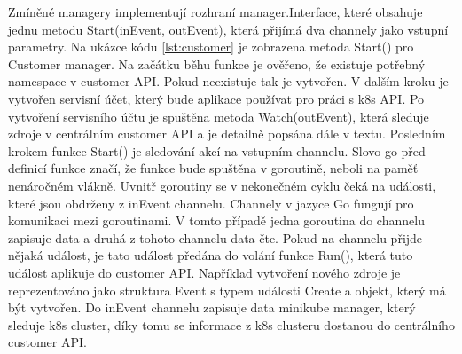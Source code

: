Zmíněné managery implementují rozhraní manager.Interface, které obsahuje jednu metodu Start(inEvent, outEvent), která přijímá dva channely jako vstupní parametry. Na ukázce kódu \ref{lst:customer} je zobrazena metoda Start() pro Customer manager. Na začátku běhu funkce je ověřeno, že existuje potřebný namespace v customer API. Pokud neexistuje tak je vytvořen. V dalším kroku je vytvořen servisní účet, který bude aplikace používat pro práci s k8s API. Po vytvoření servisního účtu je spuštěna metoda Watch(outEvent), která sleduje zdroje v centrálním customer API a je detailně popsána dále v textu. Posledním krokem funkce Start() je sledování akcí na vstupním channelu. Slovo go před definicí funkce značí, že funkce bude spuštěna v goroutině, neboli na paměť nenáročném vlákně. Uvnitř goroutiny se v nekonečném cyklu čeká na události, které jsou obdrženy z inEvent channelu. Channely v jazyce Go fungují pro komunikaci mezi goroutinami. V tomto případě jedna goroutina do channelu zapisuje data a druhá z tohoto channelu data čte. Pokud na channelu přijde nějaká událost, je tato událost předána do volání funkce Run(), která tuto událost aplikuje do customer API. Například vytvoření nového zdroje je reprezentováno jako struktura Event s typem události Create a objekt, který má být vytvořen. Do inEvent channelu zapisuje data minikube manager, který sleduje k8s cluster, díky tomu se informace z k8s clusteru dostanou do centrálního customer API.


